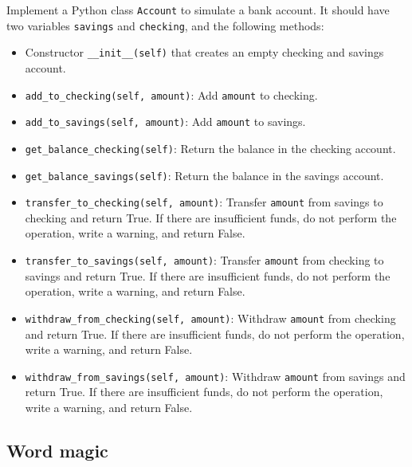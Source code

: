 Implement a Python class {\tt Account} to simulate a bank account. It 
should have two variables {\tt savings} and {\tt checking}, and the following methods:
\begin{itemize}
\item Constructor {\tt \_\_init\_\_(self)} that creates an empty checking and savings account.
\item {\tt add\_to\_checking(self, amount)}: Add {\tt amount} to checking.
\item {\tt add\_to\_savings(self, amount)}: Add {\tt amount} to savings.
\item {\tt get\_balance\_checking(self)}: Return the balance in the checking account.
\item {\tt get\_balance\_savings(self)}: Return the balance in the savings account.
\item {\tt transfer\_to\_checking(self, amount)}: Transfer {\tt amount} from savings to checking
      and return True.
      If there are insufficient funds, do not perform the operation, write a warning,
      and return False. 
\item {\tt transfer\_to\_savings(self, amount)}: Transfer {\tt amount} from checking to savings
      and return True.
      If there are insufficient funds, do not perform the operation, write a warning,
      and return False. 
\item {\tt withdraw\_from\_checking(self, amount)}: Withdraw {\tt amount} from checking
      and return True.
      If there are insufficient funds, do not perform the operation, write a warning,
      and return False. 
\item {\tt withdraw\_from\_savings(self, amount)}: Withdraw {\tt amount} from savings
      and return True.
      If there are insufficient funds, do not perform the operation, write a warning,
      and return False. 

\end{itemize}


\subsection{Word magic}

